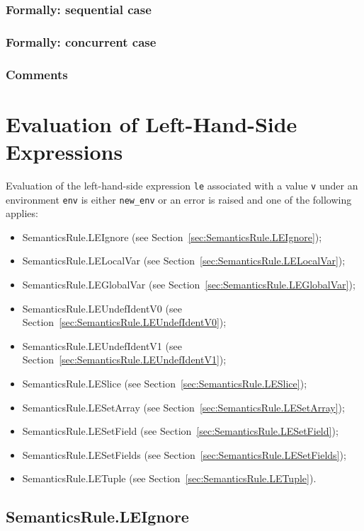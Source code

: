 \documentclass{book}
\begin{document}
  \subsection{Formally: sequential case}
  
  \subsection{Formally: concurrent case}

  \subsection{Comments}


\chapter{Evaluation of Left-Hand-Side Expressions \label{chap:eval_lexpr}}

Evaluation of the left-hand-side expression \texttt{le} associated with a
value \texttt{v} under an environment \texttt{env} is either \texttt{new\_env}
or an error is raised and one of the following applies:
\begin{itemize}
\item SemanticsRule.LEIgnore (see Section~\ref{sec:SemanticsRule.LEIgnore});
\item SemanticsRule.LELocalVar (see Section~\ref{sec:SemanticsRule.LELocalVar});
\item SemanticsRule.LEGlobalVar (see Section~\ref{sec:SemanticsRule.LEGlobalVar});
\item SemanticsRule.LEUndefIdentV0 (see Section~\ref{sec:SemanticsRule.LEUndefIdentV0});
\item SemanticsRule.LEUndefIdentV1 (see Section~\ref{sec:SemanticsRule.LEUndefIdentV1});
\item SemanticsRule.LESlice (see Section~\ref{sec:SemanticsRule.LESlice});
\item SemanticsRule.LESetArray (see Section~\ref{sec:SemanticsRule.LESetArray});
\item SemanticsRule.LESetField (see Section~\ref{sec:SemanticsRule.LESetField});
\item SemanticsRule.LESetFields (see Section~\ref{sec:SemanticsRule.LESetFields});
\item SemanticsRule.LETuple (see Section~\ref{sec:SemanticsRule.LETuple}).
\end{itemize}

\section{SemanticsRule.LEIgnore \label{sec:SemanticsRule.LEIgnore}}
\end{document}
